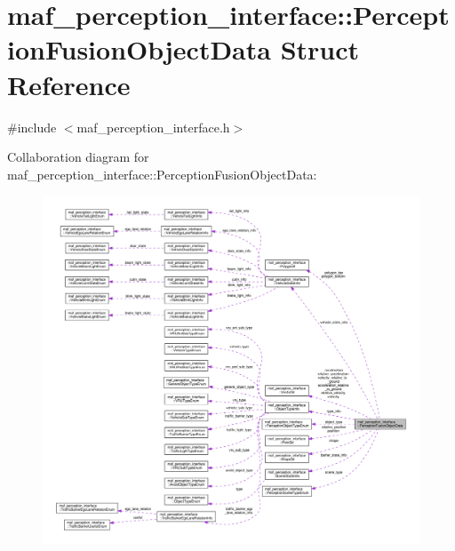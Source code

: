 \hypertarget{structmaf__perception__interface_1_1PerceptionFusionObjectData}{}\section{maf\+\_\+perception\+\_\+interface\+:\+:Perception\+Fusion\+Object\+Data Struct Reference}
\label{structmaf__perception__interface_1_1PerceptionFusionObjectData}


{\ttfamily \#include $<$maf\+\_\+perception\+\_\+interface.\+h$>$}



Collaboration diagram for maf\+\_\+perception\+\_\+interface\+:\+:Perception\+Fusion\+Object\+Data\+:\nopagebreak
\begin{figure}[H]
\begin{center}
\leavevmode
\includegraphics[width=350pt]{structmaf__perception__interface_1_1PerceptionFusionObjectData__coll__graph}
\end{center}
\end{figure}
